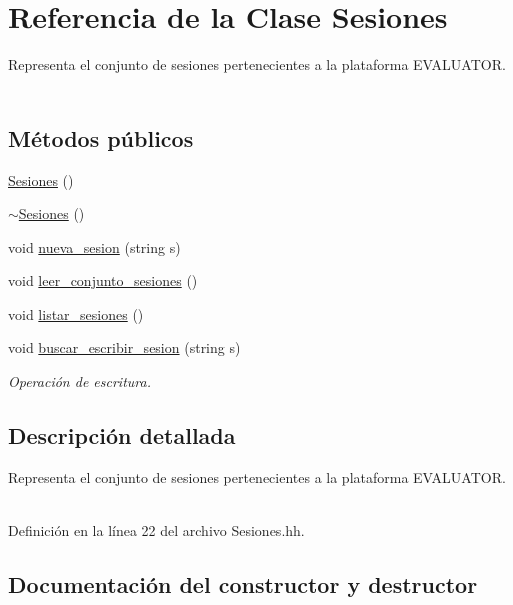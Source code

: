 \hypertarget{class_sesiones}{}\section{Referencia de la Clase Sesiones}
\label{class_sesiones}


Representa el conjunto de sesiones pertenecientes a la plataforma E\+V\+A\+L\+U\+A\+T\+OR. ~\newline
  


\subsection*{Métodos públicos}
\begin{DoxyCompactItemize}
\item 
\mbox{\hyperlink{class_sesiones_a1b845cc2a490941bac3ada0d3b6cc2f3}{Sesiones}} ()
\item 
\mbox{\hyperlink{class_sesiones_ac56862ed0ddea43917e54667173bd21a}{$\sim$\+Sesiones}} ()
\item 
void \mbox{\hyperlink{class_sesiones_a9a08619cdbf3cdc21b7be343c2f05ce4}{nueva\+\_\+sesion}} (string s)
\item 
void \mbox{\hyperlink{class_sesiones_a88fc086cf1b55ed711f78f143323ad22}{leer\+\_\+conjunto\+\_\+sesiones}} ()
\item 
void \mbox{\hyperlink{class_sesiones_a438bfbd4a37db2f08433c49d451d3e72}{listar\+\_\+sesiones}} ()
\item 
void \mbox{\hyperlink{class_sesiones_a2ade13f47c028e41888540c4f03449b6}{buscar\+\_\+escribir\+\_\+sesion}} (string s)
\begin{DoxyCompactList}\small\item\em Operación de escritura. \end{DoxyCompactList}\end{DoxyCompactItemize}


\subsection{Descripción detallada}
Representa el conjunto de sesiones pertenecientes a la plataforma E\+V\+A\+L\+U\+A\+T\+OR. ~\newline
 

Definición en la línea 22 del archivo Sesiones.\+hh.



\subsection{Documentación del constructor y destructor}
\mbox{\label{class_sesiones_a1b845cc2a490941bac3ada0d3b6cc2f3}} 
